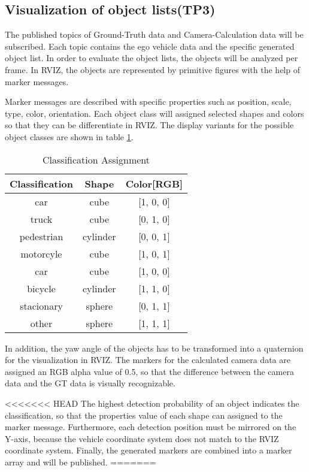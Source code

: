 \subsection{Visualization of object lists(TP3)}

The published topics of Ground-Truth data and Camera-Calculation data will be subscribed. Each topic contains the ego vehicle data and the specific generated object list. In order to evaluate the object lists, the objects will be analyzed per frame. In RVIZ, the objects are represented by primitive figures with the help of marker messages.



Marker messages are described with specific properties such as position, scale, type, color, orientation. Each object class will assigned selected shapes and colors so that they can be differentiate in RVIZ. The display variants for the possible object classes are shown in table \ref{ClassificationAssignment}. 

\begin{table}[h]
\caption{Classification Assignment}
\label{ClassificationAssignment}
\begin{center}
\begin{tabular}{c c c}
\hline
Classification & Shape & Color[RGB]\\
\hline
car & cube & [1, 0, 0]\\
truck & cube & [0, 1, 0]\\
pedestrian & cylinder & [0, 0, 1]\\
motorcyle & cube & [1, 0, 1]\\
car & cube & [1, 0, 0]\\
bicycle & cylinder & [1, 1, 0]\\
stacionary & sphere & [0, 1, 1]\\
other & sphere & [1, 1, 1]\\
\hline


\end{tabular}
\end{center}
\end{table}

In addition, the yaw angle of the objects has to be transformed into a quaternion for the visualization in RVIZ. The markers for the calculated camera data are assigned an RGB alpha value of 0.5, so that the difference between the camera data and the GT data is visually recognizable. 

<<<<<<< HEAD
The highest detection probability of an object indicates the classification, so that the properties value of each shape can assigned to the marker message. Furthermore, each detection position must be mirrored on the Y-axis, because the vehicle coordinate system does not match to the RVIZ coordinate system. Finally, the generated markers are combined into a marker array and will be published.
=======



